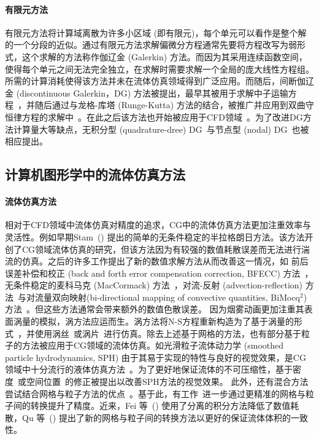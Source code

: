 \paragraph{有限元方法}
有限元方法将计算域离散为许多小区域 (即有限元)，每个单元可以看作是整个解的一个分段的近似。通过有限元方法求解偏微分方程通常先要将方程改写为弱形式，这个求解的方法称作伽辽金 (Galerkin) 方法。而因为其采用连续函数空间，使得每个单元之间无法完全独立，在求解时需要求解一个全局的庞大线性方程组。所需的计算消耗使得该方法并未在流体仿真领域得到广泛应用。而随后，间断伽辽金 (discontinuous Galerkin，DG) 方法被提出，最早其被用于求解中子运输方程~\cite{reed1973triangular}，并随后通过与龙格-库塔 (Runge-Kutta) 方法的结合，被推广并应用到双曲守恒律方程的求解中~\cite{cockburn2001runge, cockburn1990runge, cockburn1989tvb2, cockburn1989tvb3}。在此之后该方法也开始被应用于CFD领域~\cite{Zienkiewicz-2013, lomtev1999discontinuous, bassi1997high}。为了改进DG方法计算量大等缺点，无积分型 (quadrature-dree) DG~\cite{atkins1998quadrature}与节点型 (nodal) DG~\cite{hesthaven2007nodal}也被相应提出。

\subsection{计算机图形学中的流体仿真方法}
\paragraph{流体仿真方法}
相对于CFD领域中流体仿真对精度的追求，CG中的流体仿真方法更加注重效率与灵活性。例如早期Stam~(\citeyear{Stam-1999}) 提出的简单的无条件稳定的半拉格朗日方法。该方法开创了CG领域流体仿真的研究，但该方法因为有较强的数值耗散误差而无法进行湍流的仿真。之后的许多工作提出了新的数值求解方法从而改善这一情况，如 前后误差补偿和校正 (back and forth error compensation correction, BFECC) 方法~\cite{Kim-2005}，无条件稳定的麦科马克 (MacCormack) 方法~\cite{Selle-2008}，对流-反射 (advection-reflection) 方法~\cite{Zehnder-2018}与对流量双向映射(bi-directional mapping of convective quantities, BiMocq$^2$) 方法~\cite{Qu-2019}。但这些方法通常会带来额外的数值色散误差。
因为烟雾动画更加注重其表面涡量的模拟，涡方法应运而生。涡方法将N-S方程重新构造为了基于涡量的形式~\cite{Park-2005, Selle-2005}，并使用涡丝~\cite{ Weissmann-2010, Angelidis-2005}或涡片~\cite{Zhang-2015, Zhang-2014, Pfaff-2012}进行仿真。除去上述基于网格的方法，也有部分基于粒子的方法被应用于CG领域的流体仿真。如光滑粒子流体动力学 (smoothed particle hydrodynamics, SPH) 由于其易于实现的特性与良好的视觉效果，是CG领域中十分流行的液体仿真方法~\cite{Ihmsen-2014-1, Becker-2007, Adams-2007, Muller-2003, Desbrun-1996}。为了更好地保证流体的不可压缩性，基于密度~\cite{Bender-2015, Ihmsen-2014-2, Solenthaler-2009}或空间位置~\cite{Macklin-2013}的修正被提出以改善SPH方法的视觉效果。
此外，还有混合方法尝试结合网格与粒子方法的优点~\cite{Zhu-2005, Foster-1996, Brackbill-1986, Harlow-1962}。基于此，有工作~\cite{Fu-2017, Jiang-2015}进一步通过更精准的网格与粒子间的转换提升了精度。近来，Fei 等~(\citeyear{Fei-2021}) 使用了分离的积分方法降低了数值耗散，Qu 等~(\citeyear{Qu-2022}) 提出了新的网格与粒子间的转换方法以更好的保证流体体积的一致性。

